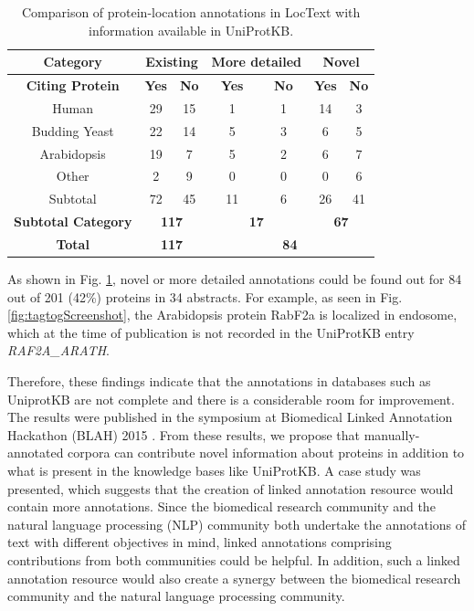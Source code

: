 \begin{table}
\centering
\begin{tabular}{|c|c|c|c|c|c|c|}
\hline
\textbf{Category} & \multicolumn{2}{c|}{\textbf{Existing}} & \multicolumn{2}{c|}{\textbf{More detailed}} & \multicolumn{2}{c|}{\textbf{Novel}} \\
\hline
\textbf{Citing Protein} & \textbf{Yes} & \textbf{No} & \textbf{Yes} & \textbf{No} & \textbf{Yes} & \textbf{No} \\
\hline
Human & 29 & 15 & 1 & 1 & 14 & 3 \\
Budding Yeast & 22 & 14 & 5 & 3 & 6 & 5 \\
Arabidopsis & 19 & 7 & 5 & 2 & 6 & 7 \\
Other & 2 & 9 & 0 & 0 & 0 & 6 \\
\hline
Subtotal & 72 & 45 & 11 & 6 & 26 & 41 \\
\hline
\textbf{Subtotal Category} & \multicolumn{2}{c|}{\textbf{117}} & \multicolumn{2}{c|}{\textbf{17}} & \multicolumn{2}{c|}{\textbf{67}} \\
 \hline
\textbf{Total} & \multicolumn{2}{c|}{\textbf{117}} & \multicolumn{4}{c|}{\textbf{84}}\\
 \hline
\end{tabular}
\caption{Comparison of protein-location annotations in LocText with information available in UniProtKB.}\label{tab:novelAnnotation}
\end{table}

As shown in Fig. \ref{tab:novelAnnotation}, novel or more detailed annotations could be found out for 84 out of 201 (42\%) proteins in 34 abstracts. For example, as seen in Fig. \ref{fig:tagtogScreenshot}, the Arabidopsis protein RabF2a is localized in endosome, which at the time of publication is not recorded in the UniProtKB entry \textit{RAF2A\_ARATH}.

Therefore, these findings indicate that the annotations in databases such as UniprotKB are not complete and there is a considerable room for improvement. The results \cite{goldberg2015linked} were published in the symposium at Biomedical Linked Annotation Hackathon (BLAH) 2015 \cite{blah}. From these results, we propose that manually-annotated corpora can contribute novel information about proteins in addition to what is present in the knowledge bases like UniProtKB. A case study was presented, which suggests that the creation of linked annotation resource would contain more annotations. Since the biomedical research community and the natural language processing (NLP) community both undertake the annotations of text with different objectives in mind, linked annotations comprising contributions from both communities could be helpful. In addition, such a linked annotation resource would also create a synergy between the biomedical research community and the natural language processing community.


